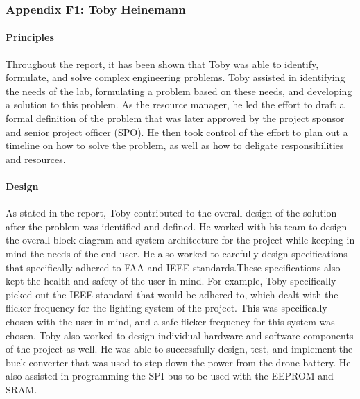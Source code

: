 \documentclass[../../main.tex]{subfiles}
\begin{document}
\subsubsection{Appendix F1: Toby Heinemann}

\paragraph{Principles}
\par Throughout the report, it has been shown that Toby was able to identify, formulate, and solve complex engineering problems. Toby assisted in identifying the needs of the lab, formulating a problem based on these needs, and developing a solution to this problem. As the resource manager, he led the effort to draft a formal definition of the problem that was later approved by the project sponsor and senior project officer (SPO). He then took control of the effort to plan out a timeline on how to solve the problem, as well as how to deligate responsibilities and resources. 

\paragraph{Design}
\par As stated in the report, Toby contributed to the overall design of the solution after the problem was identified and defined. He worked with his team to design the overall block diagram and system architecture for the project while keeping in mind the needs of the end user. He also worked to carefully design specifications that specifically adhered to FAA and IEEE standards.These specifications also kept the health and safety of the user in mind. For example, Toby specifically picked out the IEEE standard that would be adhered to, which dealt with the flicker frequency for the lighting system of the project. This was specifically chosen with the user in mind, and a safe flicker frequency for this system was chosen. Toby also worked to design individual hardware and software components of the project as well. He was able to successfully design, test, and implement the buck converter that was used to step down the power from the drone battery. He also assisted in programming the SPI bus to be used with the EEPROM and SRAM.
\end{document}
